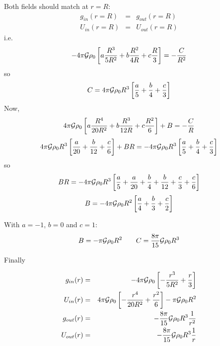 Both fields should match at $r=R$:
\begin{eqnarray}
g_{in}(r=R) &=& g_{out}(r=R) \\
U_{in}(r=R) &=& U_{out}(r=R) 
\end{eqnarray}
i.e.
\[
-4 \pi {\cal G} \rho_0 \left[ a \frac{R^3}{5R^2}+ b \frac{R^2}{4R} + c \frac{R}{3} \right]  =   -\frac{C}{R^2} 
\]
so 
\[
C = 4 \pi {\cal G} \rho_0 R^3 \left[ \frac{a}{5}+ \frac{b}{4} +  \frac{c}{3} \right]   
\]
Now, 
\[
4 \pi {\cal G} \rho_0 \left[ a \frac{R^4}{20R^2}+ b \frac{R^3}{12R} + c \frac{R^2}{6} \right] + B = -\frac{C}{R} 
\]
\[
4 \pi {\cal G} \rho_0 R^3 \left[  \frac{a}{20}+ \frac{b}{12} +  \frac{c}{6} \right] + B R = -4 \pi {\cal G} \rho_0 R^3 \left[  \frac{a}{5}+  \frac{b}{4} +  \frac{c}{3} \right]   
\]
so 
\[
B R= -4 \pi {\cal G} \rho_0 R^3 \left[
 \frac{a}{5}+ \frac{a}{20}
+\frac{b}{4}+ \frac{b}{12}
+\frac{c}{3}+ \frac{c}{6}
\right]
\]
\[
B = -4 \pi {\cal G} \rho_0 R^2 \left[
 \frac{a}{4}
+\frac{b}{3}
+\frac{c}{2}
\right]
\]

With $a=-1$, $b=0$ and $c=1$:
\[
B = - \pi {\cal G} \rho_0 R^2  
\qquad
C = \frac{8\pi}{15} {\cal G} \rho_0 R^3 
\]

Finally

\begin{eqnarray}
g_{in}(r) &=&  -4 \pi {\cal G} \rho_0 \left[ - \frac{r^3}{5R^2}+   \frac{r}{3} \right]  \\
U_{in}(r) &=& 4 \pi {\cal G} \rho_0 \left[ - \frac{r^4}{20R^2} +  \frac{r^2}{6} \right] 
 - \pi {\cal G} \rho_0 R^2  \\
g_{out}(r) &=& - \frac{8\pi}{15} {\cal G} \rho_0 R^3 \frac{1}{r^2} \\ 
U_{out}(r) &=& -\frac{8\pi}{15} {\cal G} \rho_0 R^3 \frac{1}{r}  
\end{eqnarray}





